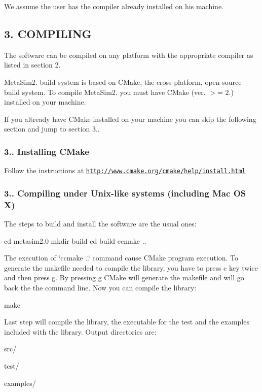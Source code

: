 We assume the user has the compiler already installed on his machine.

\subsection*{3. C\+O\+M\+P\+I\+L\+I\+NG}

The software can be compiled on any platform with the appropriate compiler as listed in section 2.

Meta\+Sim2. build system is based on C\+Make, the cross-\/platform, open-\/source build system. To compile Meta\+Sim2. you must have C\+Make (ver. $>$= 2.) installed on your machine.

If you altready have C\+Make installed on your machine you can skip the following section and jump to section 3..

\subsubsection*{3.. Installing C\+Make}

Follow the instructions at \href{http://www.cmake.org/cmake/help/install.html}{\tt http\+://www.\+cmake.\+org/cmake/help/install.\+html}

\subsubsection*{3.. Compiling under Unix-\/like systems (including Mac OS X)}

The steps to build and install the software are the usual ones\+: \begin{DoxyVerb}cd metasim2.0
mkdir build
cd build
ccmake ..
\end{DoxyVerb}


The execution of \char`\"{}ccmake ..\char`\"{} command cause C\+Make program execution. To generate the makefile needed to compile the library, you have to press \textquotesingle{}c\textquotesingle{} key twice and then press \textquotesingle{}g\textquotesingle{}. By pressing \textquotesingle{}g\textquotesingle{} C\+Make will generate the makefile and will go back the the command line. Now you can compile the library\+: \begin{DoxyVerb}make 
\end{DoxyVerb}


Last step will compile the library, the executable for the test and the examples included with the library. Output directories are\+:
\begin{DoxyItemize}
\item src/
\item test/
\item examples/
\end{DoxyItemize}

